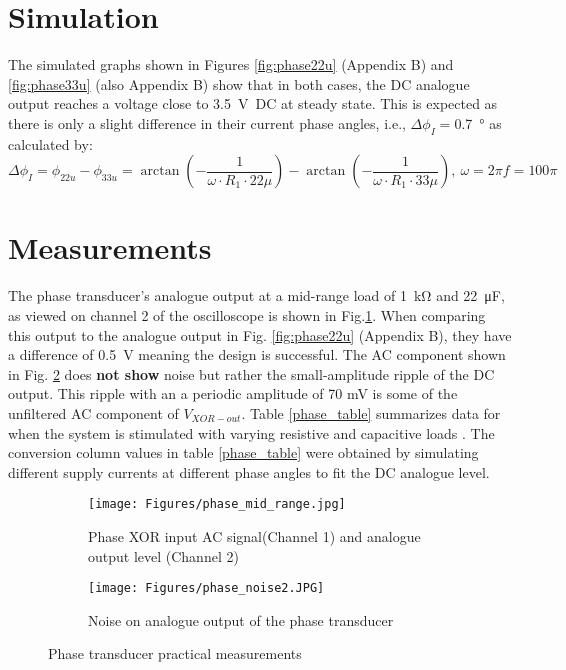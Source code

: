 \section{Simulation} \label{sec:simulation_phase}

The simulated graphs shown in Figures \ref{fig:phase22u} (Appendix B) and \ref{fig:phase33u} (also Appendix B) show that in both cases, the DC analogue output reaches a voltage close to \SI{3.5}{\volt DC} at steady state. This is expected as there is only a slight difference in their current phase angles, i.e., $\Delta\phi_{I}=$\SI{0.7}{\degree} as calculated by: 
$$\Delta\phi_{I}=\phi_{22u}-\phi_{33u}=\arctan(-\frac{1}{\omega\cdot R_1 \cdot 22\mu})-\arctan(-\frac{1}{\omega\cdot R_1 \cdot 33\mu}), \ \omega=2 \pi f=100 \pi$$
 
\section{Measurements} \label{sec:measurements_phase}



{\footnotesize The phase transducer's analogue output at a mid-range load of \SI{1}{\kilo\ohm} and \SI{22}{\micro\farad}, as viewed on channel 2 of the oscilloscope is shown in Fig.\ref{subfig:phase_oscillo}. When comparing this output to the analogue output in Fig. \ref{fig:phase22u} (Appendix B), they have a difference of \SI{0.5}{V} meaning the design is successful. The AC component shown in Fig. \ref{fig:phase_noise} does \textbf{not show} noise but rather the small-amplitude ripple of the DC output. This ripple with an a periodic amplitude of 70 mV is some of the unfiltered AC component of $V_{XOR-out}$. Table \ref{phase_table} summarizes data for when the system is stimulated with varying resistive and capacitive loads \cite{assignment_2}.  The conversion column values in table \ref{phase_table} were obtained by simulating different supply currents at different phase angles to fit the DC analogue level.}

\begin{figure}[H]
\centering
\begin{subfigure}{.5\textwidth}
     \centering
    \texttt{[image: Figures/phase\_mid\_range.jpg]}
    \caption{Phase XOR input AC signal(Channel 1) and analogue output level (Channel 2)}
    \label{subfig:phase_oscillo}
\end{subfigure}%
\begin{subfigure}{.5\textwidth}
     \centering
    \texttt{[image: Figures/phase\_noise2.JPG]}
    \caption{Noise on analogue output of the phase transducer}
    \label{fig:phase_noise}
\end{subfigure}
\label{phase_practical}
\caption{Phase transducer practical measurements}
\end{figure}


